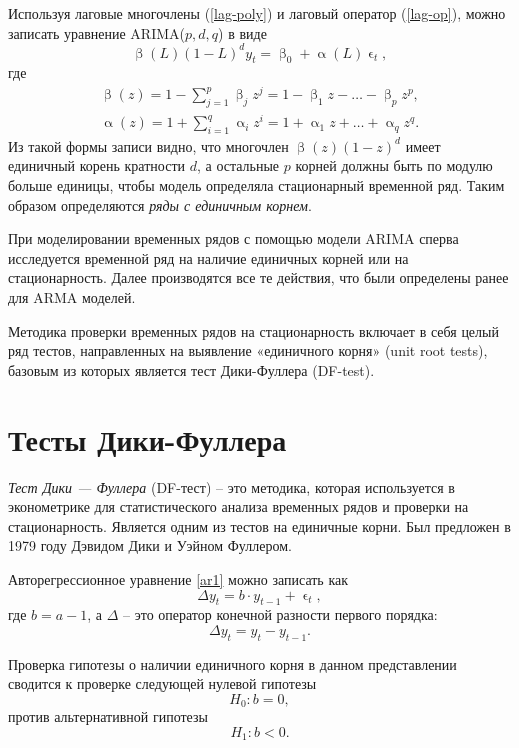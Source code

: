 \documentclass[a4paper, 14pt]{extreport}
\numberwithin{equation}{section}
\renewcommand{\alpha}{\upalpha}
\renewcommand{\beta}{\upbeta}
\renewcommand{\epsilon}{\upvarepsilon}
\numberwithin{equation}{section}
\begin{document}
	Используя лаговые многочлены (\ref{lag-poly}) и лаговый оператор (\ref{lag-op}), можно записать уравнение ARIMA($p,d,q$) в виде
	\begin{equation}
		\beta(L)(1-L)^d y_t = \beta_0 + \alpha(L)\epsilon_t,
	\end{equation}
	где
	\begin{eqnarray*}
		\beta(z) = 1 - \sum_{j=1}^{p} \beta_j z^j = 1 - \beta_1 z - \ldots - \beta_p z^p,\\
		\alpha(z) = 1 + \sum_{i=1}^{q} \alpha_i z^i = 1 + \alpha_1 z + \ldots + \alpha_q z^q.
	\end{eqnarray*}
	Из такой формы записи видно, что многочлен  
	$\beta(z)(1-z)^d$
	имеет единичный корень кратности $d$, а остальные $p$ корней должны быть по модулю больше единицы, чтобы модель определяла стационарный временной ряд. Таким образом определяются \textit{ряды с единичным корнем}.
	
	При моделировании временных рядов с помощью модели ARIMA сперва исследуется временной ряд на наличие единичных корней или на стационарность. Далее производятся все те действия, что были определены ранее для ARMA моделей.
	
	Методика проверки временных рядов на стационарность включает в себя целый
	ряд тестов, направленных на выявление «единичного корня» (unit root tests), базовым
	из которых является тест Дики-Фуллера (DF-test).
	\section{Тесты Дики-Фуллера}
	
	\textit{Тест Дики — Фуллера} (DF-тест) -- это методика, которая используется в эконометрике для статистического анализа временных рядов и проверки на стационарность. Является одним из тестов на единичные корни. Был предложен в 1979 году Дэвидом Дики и Уэйном Фуллером.
	
	Авторегрессионное уравнение \eqref{ar1} можно записать как
	\begin{equation}
		\Delta y_t = b \cdot y_{t-1} + \epsilon_t,
	\end{equation}
	где $b = a - 1$, а $\Delta$ -- это оператор конечной разности первого порядка:
	\begin{equation*}
		\Delta y_t = y_t - y_{t-1}.
	\end{equation*}
	
	Проверка гипотезы о наличии единичного корня в данном представлении сводится к проверке следующей нулевой гипотезы
	\begin{equation}
		H_0: b = 0,
	\end{equation}
	против альтернативной гипотезы
	\begin{equation}
		H_1: b < 0.
	\end{equation}
	
\end{document}
